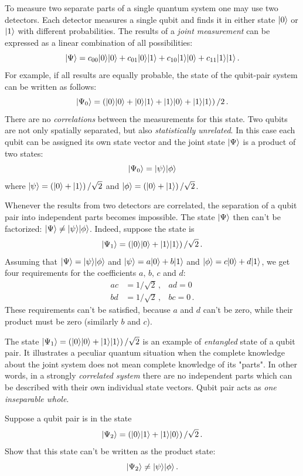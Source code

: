 To measure two separate parts of a single quantum system one may use two detectors. Each detector measures a single qubit and finds it in either state $|{0}\rangle$ or $|{1}\rangle$ with different probabilities. The results of a \emph{joint measurement} can be expressed as a linear combination of all possibilities:
\[
|{\Psi}\rangle = c_{00}|{0}\rangle|{0}\rangle + c_{01}|{0}\rangle|{1}\rangle+c_{10}|{1}\rangle|{0}\rangle+c_{11}|{1}\rangle|{1}\rangle\,.
\]
For example, if all results are equally probable, the state of the qubit-pair system can be written as follows:
\[
|{\Psi_0}\rangle = \left(|{0}\rangle|{0}\rangle + |{0}\rangle|{1}\rangle+|{1}\rangle|{0}\rangle+|{1}\rangle|{1}\rangle\right )/2\,.
\]
There are no \emph{correlations} between the measurements for this state. Two qubits are not only spatially separated, but also \emph{statistically unrelated}. In this case each qubit can be assigned its own state vector and the joint state $|{\Psi}\rangle$ is a product of two states:
\[
|{\Psi_0}\rangle=|{\psi}\rangle|{\phi}\rangle
\]
where $|{\psi}\rangle=\left(|{0}\rangle+|{1}\rangle\right)/\sqrt{2}$ and $|{\phi}\rangle=\left(|{0}\rangle+|{1}\rangle\right)/\sqrt{2}$.

Whenever the results from two detectors are correlated, the separation of a qubit pair into independent parts becomes impossible. The state $|{\Psi}\rangle$ then can't be factorized: $|{\Psi}\rangle\ne |{\psi}\rangle|{\phi}\rangle$. Indeed, suppose the state is 
\[
|{\Psi_1}\rangle = \left(|{0}\rangle|{0}\rangle + |{1}\rangle|{1}\rangle\right )/\sqrt{2}\,.
\]
Assuming that $|{\Psi}\rangle=|{\psi}\rangle|{\phi}\rangle$ and $|{\psi}\rangle=a|{0}\rangle+b|{1}\rangle$ and $|{\phi}\rangle=c|{0}\rangle+d|{1}\rangle$, we get four requirements for the coefficients $a,\,b,\, c$ and $d$:
\begin{align*}
	ac & = 1/\sqrt{2}\,, & ad=0\\
	bd & = 1/\sqrt{2}\,, & bc=0\,.
\end{align*}
These requirements can't be satisfied, because $a$ and $d$ can't be zero, while their product must be zero (similarly $b$ and $c$). 

The state $|{\Psi_1}\rangle = \left(|{0}\rangle|{0}\rangle + |{1}\rangle|{1}\rangle\right )/\sqrt{2}$ is an example of \emph{entangled} state of a qubit pair. It illustrates a peculiar quantum situation when the complete knowledge about the joint system does not mean complete knowledge of its "parts". In other words, in a strongly \emph{correlated system} there are no independent parts which can be described with their own individual state vectors. Qubit pair acts as \emph{one inseparable whole}.

\begin{exercise}
	Suppose a qubit pair is in the state 
	\[
	|{\Psi_2}\rangle = \left(|{0}\rangle|{1}\rangle + |{1}\rangle|{0}\rangle\right )/\sqrt{2}\,.
	\]
	Show that this state can't be written as the product state:
	\[
	|{\Psi_2}\rangle \ne |{\psi}\rangle|{\phi}\rangle\,.
	\]
\end{exercise}

